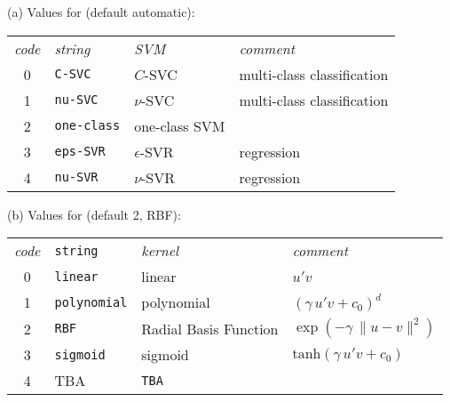 \documentclass{article}
\begin{document}

\begin{table}[p]
  (a) Values for  (default automatic):
  \begin{center}
  \begin{tabular}{clll}
\textit{code} & \textit{string} & \textit{SVM} & \textit{comment} \\[2pt]
0 & \verb|C-SVC| & $C$-SVC & multi-class classification \\
1 & \verb|nu-SVC| & $\nu$-SVC & multi-class classification \\
2 & \verb|one-class| & one-class SVM & \\
3 & \verb|eps-SVR| & $\epsilon$-SVR & regression \\
4 & \verb|nu-SVR| & $\nu$-SVR & regression
  \end{tabular}
  \end{center}

  (b) Values for  (default 2, RBF):
  \begin{center}
  \begin{tabular}{clll}
\textit{code} & \texttt{string} & \textit{kernel} & \textit{comment} \\[2pt]
0 & \verb|linear| & linear & $u'v$ \\
1 & \verb|polynomial| & polynomial & $(\gamma\, u'v + c_0)^d$ \\
2 & \verb|RBF| & Radial Basis Function & $\exp(-\gamma\, \lVert u-v \rVert^2)$ \\
3 & \verb|sigmoid| & sigmoid & $\mbox{tanh}(\gamma\, u'v + c_0)$ \\
4 & TBA & \texttt{TBA}
  \end{tabular}
  \end{center}


\end{table}
\end{document}
